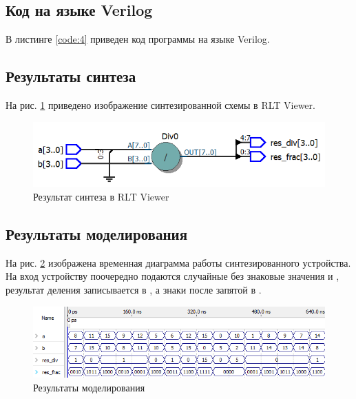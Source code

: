 \subsection{Код на языке Verilog}

В листинге \ref{code:4} приведен код программы на языке Verilog.



\subsection{Результаты синтеза}

На рис. \ref{fig:elab2_1_rtl} приведено изображение синтезированной схемы в RLT Viewer.

\begin{figure}[H]
\begin{center}
	\includegraphics[scale=0.8]{elab2_1_rtl}
	\caption{Результат синтеза в RLT Viewer}
	\label{fig:elab2_1_rtl}
\end{center}
\end{figure}

\subsection{Результаты моделирования}
\label{sec:elab2_1_modeling}

На рис. \ref{fig:elab2_1_modeling} изображена временная диаграмма работы синтезированного устройства. На вход устройству поочередно подаются случайные без знаковые значения  и , результат деления записывается в , а знаки после запятой в .
\begin{figure}[H]
\begin{center}
	\includegraphics[width=\textwidth]{elab2_1_modeling}
	\caption{Результаты моделирования}
	\label{fig:elab2_1_modeling}
\end{center}
\end{figure}


